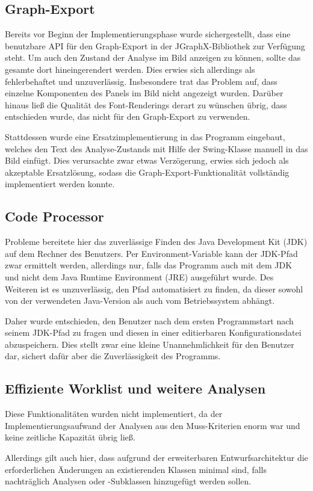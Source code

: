 \subsection{Graph-Export}

Bereits vor Beginn der Implementierungsphase wurde sichergestellt, dass eine benutzbare API für den Graph-Export in der JGraphX-Bibliothek zur Verfügung steht.
Um auch den Zustand der Analyse im Bild anzeigen zu können, sollte das gesamte  dort hineingerendert werden.
Dies erwies sich allerdings als fehlerbehaftet und unzuverlässig. 
Insbesondere trat das Problem auf, dass einzelne Komponenten des Panels im Bild nicht angezeigt wurden.
Darüber hinaus ließ die Qualität des Font-Renderings derart zu wünschen übrig, dass entschieden wurde, das  nicht für den Graph-Export zu verwenden.

Stattdessen wurde eine Ersatzimplementierung in das Programm eingebaut, welches den Text des Analyse-Zustands mit Hilfe der Swing-Klasse  manuell in das Bild einfügt.
Dies verursachte zwar etwas Verzögerung, erwies sich jedoch als akzeptable Ersatzlösung, sodass die Graph-Export-Funktionalität vollständig implementiert werden konnte.

\newpage
\subsection{Code Processor}

Probleme bereitete hier das zuverlässige Finden des Java Development Kit (JDK) auf dem Rechner des Benutzers.
Per Environment-Variable kann der JDK-Pfad zwar ermittelt werden, allerdings nur, falls das Programm auch mit dem JDK und nicht dem Java Runtime Environment (JRE) ausgeführt wurde.
Des Weiteren ist es unzuverlässig, den Pfad automatisiert zu finden, da dieser sowohl von der verwendeten Java-Version als auch vom Betriebssystem abhängt.

Daher wurde entschieden, den Benutzer nach dem ersten Programmstart nach seinem JDK-Pfad zu fragen und diesen in einer editierbaren Konfigurationsdatei abzuspeichern.
Dies stellt zwar eine kleine Unannehmlichkeit für den Benutzer dar, sichert dafür aber die Zuverlässigkeit des Programms.

\subsection{Effiziente Worklist und weitere Analysen}

Diese Funktionalitäten wurden nicht implementiert, da der Implementierungsaufwand der Analysen aus den Muss-Kriterien enorm war und keine zeitliche Kapazität übrig ließ.

Allerdings gilt auch hier, dass aufgrund der erweiterbaren Entwurfsarchitektur die erforderlichen Änderungen an existierenden Klassen minimal sind, falls nachträglich Analysen oder -Subklassen hinzugefügt werden sollen.
